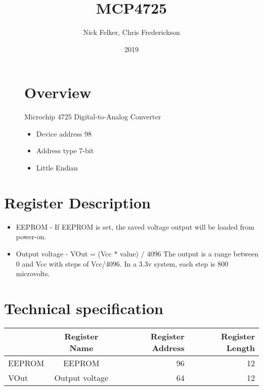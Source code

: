 \documentclass[a4paper,12pt,oneside,pdflatex,italian,final,twocolumn]{article}
\title{ MCP4725 }
\author{ Nick Felker, Chris Frederickson }
\date{ 2019 }
\begin{document}
\pagestyle{fancy}



\onecolumn


\begin{figure}
\begin{minipage}{0.47\textwidth}

\section{Overview}
    Microchip 4725 Digital-to-Analog Converter
    \begin{itemize}
        \item Device address 98
        \item Address type 7-bit
        \item Little Endian
    \end{itemize}


\end{minipage}
\hfill

\end{figure}


\section{Register Description}
\begin{itemize}
\item EEPROM - If EEPROM is set, the saved voltage output will
be loaded from power-on.

\item Output voltage - VOut = (Vcc * value) / 4096
The output is a range between 0 and Vcc with
steps of Vcc/4096.
In a 3.3v system, each step is 800 microvolts.

\end{itemize}

\section{Technical specification}
\centering
\begin{tabular}{lcrr}
\toprule
 & Register Name & Register Address & Register Length \\
\midrule
EEPROM & EEPROM & 96 & 12 \\
VOut & Output voltage & 64 & 12 \\
\bottomrule
\end{tabular}

\raggedright
\end{document}
